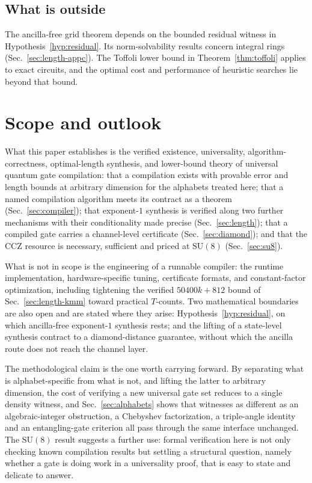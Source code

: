 \documentclass[aps,pra,reprint,nofootinbib,superscriptaddress]{revtex4-2}
\newcommand{\su}[1]{\mathrm{SU}(#1)}
\theoremstyle{plain}
\theoremstyle{definition}
\begin{document}
\subsection{What is outside}

The ancilla-free grid theorem depends on the bounded residual witness in
Hypothesis~\ref{hyp:residual}. Its norm-solvability results concern integral
rings (Sec.~\ref{sec:length-appc}). The Toffoli lower bound in
Theorem~\ref{thm:toffoli} applies to exact circuits, and the optimal cost
and performance of heuristic searches lie beyond that bound.

\section{Scope and outlook}
\label{sec:scope}

What this paper establishes is the verified existence, universality,
algorithm-correctness, optimal-length synthesis, and lower-bound theory of
universal quantum gate compilation: that a compilation exists with provable
error and length bounds at arbitrary dimension for the alphabets treated here;
that a named compilation algorithm meets its contract as a theorem
(Sec.~\ref{sec:compiler}); that exponent-$1$ synthesis is verified along two
further mechanisms with their conditionality made precise
(Sec.~\ref{sec:length}); that a compiled gate carries a channel-level
certificate (Sec.~\ref{sec:diamond}); and that the CCZ resource is necessary,
sufficient and priced at $\su 8$ (Sec.~\ref{sec:su8}).

What is not in scope is the engineering of a runnable compiler: the runtime
implementation, hardware-specific tuning, certificate formats, and
constant-factor optimization, including tightening the verified $50400k + 812$
bound of Sec.~\ref{sec:length-kmm} toward practical $T$-counts. Two
mathematical boundaries are also open and are stated where they arise:
Hypothesis~\ref{hyp:residual}, on which ancilla-free exponent-$1$ synthesis
rests; and the lifting of a state-level synthesis contract to a diamond-distance
guarantee, without which the ancilla route does not reach the channel layer.

The methodological claim is the one worth carrying forward. By separating what
is alphabet-specific from what is not, and lifting the latter to arbitrary
dimension, the cost of verifying a new universal gate set reduces to a single
density witness, and Sec.~\ref{sec:alphabets} shows that witnesses as different
as an algebraic-integer obstruction, a Chebyshev factorization, a triple-angle
identity and an entangling-gate criterion all pass through the same interface
unchanged. The $\su 8$ result suggests a further use: formal verification here
is not only checking known compilation results but settling a structural
question, namely whether a gate is doing work in a universality proof, that is
easy to state and delicate to answer.
\end{document}
